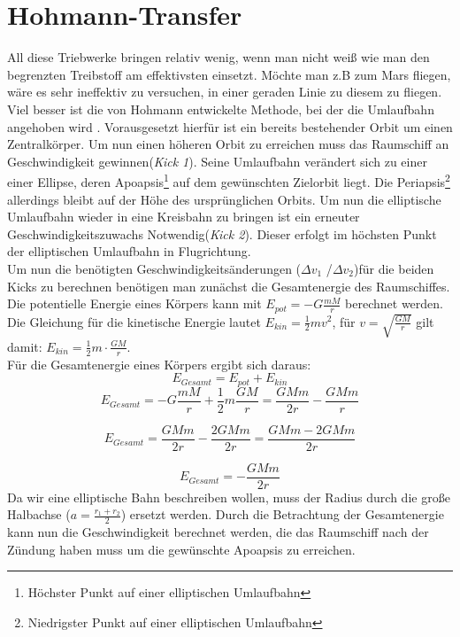 \documentclass[12pt,a4paper]{article}
\begin{document}
\section{Hohmann-Transfer}
All diese Triebwerke bringen relativ wenig, wenn man nicht weiß wie man den begrenzten Treibstoff am effektivsten einsetzt. Möchte man z.B zum Mars fliegen, wäre es sehr ineffektiv zu versuchen, in einer geraden Linie zu diesem zu fliegen. Viel besser ist die von Hohmann entwickelte Methode, bei der die Umlaufbahn angehoben wird . Vorausgesetzt hierfür ist ein bereits bestehender Orbit um einen Zentralkörper. Um nun einen höheren Orbit zu erreichen muss das Raumschiff an Geschwindigkeit gewinnen(\emph{Kick 1}). Seine Umlaufbahn verändert sich zu einer einer Ellipse, deren Apoapsis\footnote{Höchster Punkt auf einer elliptischen Umlaufbahn} auf dem gewünschten Zielorbit liegt. Die Periapsis\footnote{Niedrigster Punkt auf einer elliptischen Umlaufbahn} allerdings bleibt auf der Höhe des ursprünglichen Orbits. Um nun die elliptische Umlaufbahn wieder in eine Kreisbahn zu bringen ist ein erneuter Geschwindigkeitszuwachs Notwendig(\emph{Kick 2}). Dieser erfolgt im höchsten Punkt der elliptischen Umlaufbahn in Flugrichtung.\\
Um nun die benötigten Geschwindigkeitsänderungen ($\Delta v_1 $ /$\Delta v_2 $)für die beiden Kicks zu berechnen benötigen man zunächst die Gesamtenergie des Raumschiffes.\\
Die potentielle Energie eines Körpers kann mit $E_{pot} = - G \frac{mM}{r} $ berechnet werden. Die Gleichung für die kinetische Energie lautet $E_{kin} = \frac{1}{2}mv^2$, für $v = \sqrt{\frac{GM}{r}}$  gilt damit: $ E_{kin} = \frac{1}{2}m \cdot \frac{GM}{r}$. 
\\Für die Gesamtenergie eines Körpers ergibt sich daraus:
\begin{equation}
E_{Gesamt} = E_{pot} + E_{kin} 
\end{equation}
\begin{equation}
E_{Gesamt} = - G \frac{mM}{r} + \frac{1}{2}m\frac{GM}{r} = \frac{GMm}{2r} -\frac{GMm}{r} 
\end{equation}

\begin{equation}
E_{Gesamt} = \frac{GMm}{2r} -\frac{2GMm}{2r} = \frac{GMm - 2GMm}{2r}
\end{equation}

\begin{equation}
E_{Gesamt} = - \frac{GMm}{2r}
\end{equation}
Da wir eine elliptische Bahn beschreiben wollen, muss der Radius durch die große Halbachse ($a = \frac{r_1+r_2}{2} $) ersetzt werden.
Durch die Betrachtung der Gesamtenergie kann nun die Geschwindigkeit berechnet werden, die das Raumschiff nach der Zündung haben muss um die gewünschte Apoapsis zu erreichen. 
\end{document}

